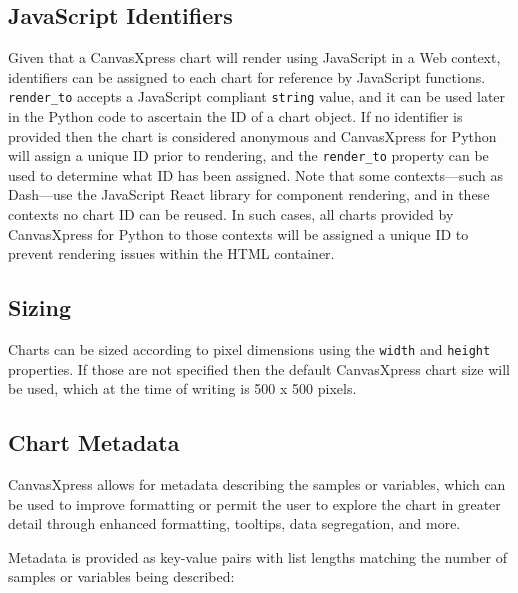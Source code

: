 \documentclass[
  letterpaper,
  DIV=11,
  numbers=noendperiod]{scrartcl}
\begin{document}
\hypertarget{javascript-identifiers}{%
\subsection{JavaScript Identifiers}\label{javascript-identifiers}}

Given that a CanvasXpress chart will render using JavaScript in a Web
context, identifiers can be assigned to each chart for reference by
JavaScript functions. \texttt{render\_to} accepts a JavaScript compliant
\texttt{string} value, and it can be used later in the Python code to
ascertain the ID of a chart object. If no identifier is provided then
the chart is considered anonymous and CanvasXpress for Python will
assign a unique ID prior to rendering, and the \texttt{render\_to}
property can be used to determine what ID has been assigned. Note that
some contexts---such as Dash---use the JavaScript React library for
component rendering, and in these contexts no chart ID can be reused. In
such cases, all charts provided by CanvasXpress for Python to those
contexts will be assigned a unique ID to prevent rendering issues within
the HTML container.

\hypertarget{sizing}{%
\subsection{Sizing}\label{sizing}}

Charts can be sized according to pixel dimensions using the
\texttt{width} and \texttt{height} properties. If those are not
specified then the default CanvasXpress chart size will be used, which
at the time of writing is 500 x 500 pixels.

\hypertarget{chart-metadata}{%
\subsection{Chart Metadata}\label{chart-metadata}}

CanvasXpress allows for metadata describing the samples or variables,
which can be used to improve formatting or permit the user to explore
the chart in greater detail through enhanced formatting, tooltips, data
segregation, and more.

Metadata is provided as key-value pairs with list lengths matching the
number of samples or variables being described:
\end{document}
